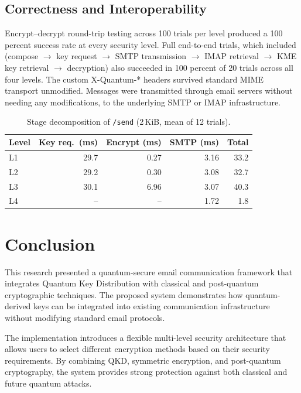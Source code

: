 \documentclass[conference]{IEEEtran}
\begin{document}
\subsection{Correctness and Interoperability}

Encrypt–decrypt round-trip testing across 100 trials per level produced a 100 percent success rate at every security level. Full end-to-end trials, which included (compose $\rightarrow$ key request $\rightarrow$ SMTP transmission $\rightarrow$
IMAP retrieval $\rightarrow$ KME key retrieval $\rightarrow$ decryption) also succeeded in 100 percent of 20 trials across all four levels. The custom X-Quantum-* headers survived standard MIME transport unmodified. Messages were transmitted through email servers without needing any modifications, to the underlying SMTP or IMAP infrastructure.

\begin{table}[t]
\centering
\caption{Stage decomposition of \texttt{/send} (2\,KiB, mean of 12 trials).}
\label{tab:stages}
\begin{tabular}{|l|r|r|r|r|}
\hline
\textbf{Level} & \textbf{Key req.\ (ms)} & \textbf{Encrypt (ms)} & \textbf{SMTP (ms)} & \textbf{Total} \\
\hline
L1 & 29.7 & 0.27 & 3.16 & 33.2 \\
L2 & 29.2 & 0.30 & 3.08 & 32.7 \\
L3 & 30.1 & 6.96 & 3.07 & 40.3 \\
L4 & --   & --   & 1.72 & 1.8  \\
\hline
\end{tabular}
\end{table}

\section*{Conclusion}

This research presented a quantum-secure email communication framework that integrates Quantum Key Distribution with classical and post-quantum cryptographic techniques. The proposed system demonstrates how quantum-derived keys can be integrated into existing communication infrastructure without modifying standard email protocols.

The implementation introduces a flexible multi-level security architecture that allows users to select different encryption methods based on their security requirements. By combining QKD, symmetric encryption, and post-quantum cryptography, the system provides strong protection against both classical and future quantum attacks.
\end{document}
